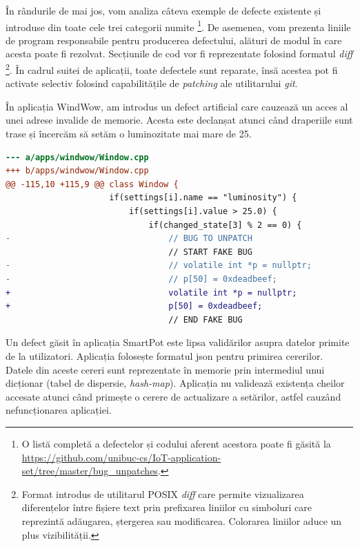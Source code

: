 În rândurile de mai jos, vom analiza câteva exemple de defecte existente și introduse din toate cele trei categorii numite \footnote{O listă completă a defectelor și codului aferent acestora poate fi găsită la \url{https://github.com/unibuc-cs/IoT-application-set/tree/master/bug_unpatches}.}. De asemenea, vom prezenta liniile de program responsabile pentru producerea defectului, alături de modul în care acesta poate fi rezolvat. Secțiunile de cod vor fi reprezentate folosind formatul \textit{diff} \footnote{Format introdus de utilitarul POSIX \textit{diff} care permite vizualizarea diferențelor între fișiere text prin prefixarea liniilor cu simboluri care reprezintă adăugarea, ștergerea sau modificarea. Colorarea liniilor aduce un plus vizibilității.}. În cadrul suitei de aplicații, toate defectele sunt reparate, însă acestea pot fi activate selectiv folosind capabilitățile de \textit{patching} ale utilitarului \textit{git}.

În aplicația WindWow, am introdus un defect artificial care cauzează un acces al unei adrese invalide de memorie. Acesta este declanșat atunci când draperiile sunt trase și încercăm să setăm o luminozitate mai mare de 25.

\begin{lstlisting}[language=diff, caption={Accesarea adresei nule va cauza oprirea aplicației WindWow}]
--- a/apps/windwow/Window.cpp
+++ b/apps/windwow/Window.cpp
@@ -115,10 +115,9 @@ class Window {
                     if(settings[i].name == "luminosity") {
                         if(settings[i].value > 25.0) {
                             if(changed_state[3] % 2 == 0) {
-                                // BUG TO UNPATCH
                                 // START FAKE BUG
-                                // volatile int *p = nullptr;
-                                // p[50] = 0xdeadbeef;
+                                volatile int *p = nullptr;
+                                p[50] = 0xdeadbeef;
                                 // END FAKE BUG
\end{lstlisting}

Un defect găsit în aplicația SmartPot este lipsa validărilor asupra datelor primite de la utilizatori. Aplicația folosește formatul \acrshort{json} pentru primirea cererilor. Datele din aceste cereri sunt reprezentate în memorie prin intermediul unui dicționar (tabel de dispersie, \textit{hash-map}). Aplicația nu validează existența cheilor accesate atunci când primește o cerere de actualizare a setărilor, astfel cauzând nefuncționarea aplicației.


